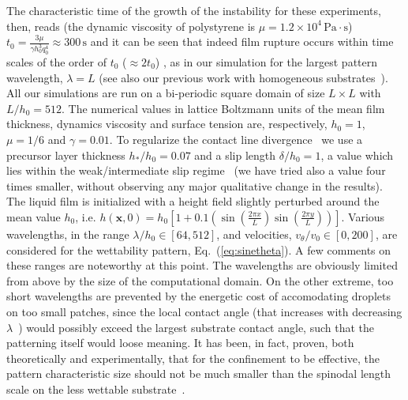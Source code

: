 The characteristic time of the growth of the instability for these experiments, then, reads \cite{fetzerThermalNoiseInfluences2007} (the dynamic viscosity of polystyrene is $\mu = 1.2 \times 10^4 \, \text{Pa} \cdot \text{s}$) $t_0 = \frac{3\mu}{\gamma h_0^3 q_0^4} \approx 300 \, \text{s}$ and it can be seen that indeed film rupture occurs within time scales of the order of $t_0$ ($\approx 2 t_0$) \cite{beckerComplexDewettingScenarios2003}, as in our simulation for the largest pattern wavelength, $\lambda = L$ (see also our previous work with homogeneous substrates~\cite{zitzLatticeBoltzmannSimulations2021}).
All our simulations are run on a bi-periodic square domain of size $L \times L$ with $L/h_0 = 512 $. The numerical values in lattice Boltzmann units of the mean film thickness, dynamics viscosity and surface tension are, respectively, $h_0=1$, $\mu=1/6$ and $\gamma=0.01$.
To regularize the contact line divergence~\cite{huhHydrodynamicModelSteady1971} we use a precursor layer thickness $h_{\ast}/h_0=0.07$ and a slip length $\delta/h_0 = 1$, a value which lies within the weak/intermediate slip regime~\cite{peschkaSignaturesSlipDewetting2019,fetzerQuantifyingHydrodynamicSlip2007, munchLubricationModelsSmall2005} (we have tried also a value four times smaller, without observing any major qualitative change in the results).
The liquid film is initialized with a height field slightly perturbed around the mean value $h_0$, i.e. $h(\mathbf{x},0) = h_0 \left[1 + 0.1 \left(\sin\left(\frac{2\pi x}{L}\right)\sin\left(\frac{2\pi y}{L}\right)\right)\right]$.
Various wavelengths, in the range $\lambda/h_0 \in [64, 512]$, and velocities, $v_{\theta}/v_0 \in [0, 200]$, are considered for the wettability pattern, Eq.~(\ref{eq:sinetheta}). 
A few comments on these ranges are noteworthy at this point. 
The wavelengths are obviously limited from above by the size of the computational domain. On the other extreme, too short wavelengths are prevented by the energetic cost of accomodating droplets on too small patches, since the local contact angle (that increases with decreasing $\lambda$~\cite{SuppMat}) would possibly exceed the largest substrate contact angle, such that the patterning itself would loose meaning. 
It has been, in fact, proven, both theoretically and experimentally, that for the confinement to be effective, the pattern characteristic size should not be much smaller than the spinodal length scale on the less wettable substrate~\cite{karguptaMorphologicalSelforganizationDewetting2002,karguptaInstabilityPatternFormation2000,nisatoExcitationSurfaceDeformation1999,karimPhaseSeparationUltrathin1998}.
